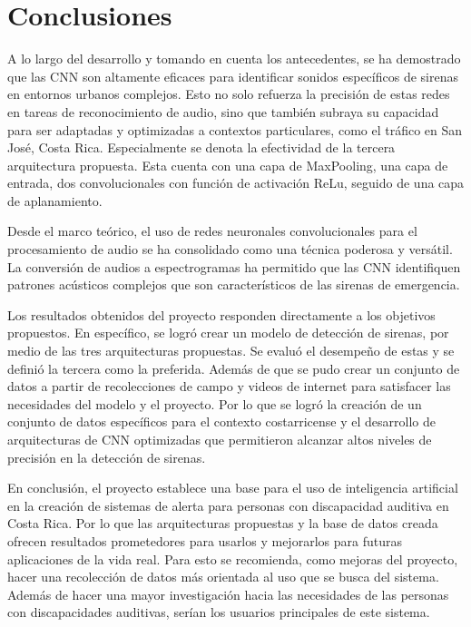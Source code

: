 \documentclass[conference, spanish, english]{IEEEtran}
\begin{document}
\section{Conclusiones}
A lo largo del desarrollo y tomando en cuenta los antecedentes, se ha demostrado que las CNN son altamente eficaces para identificar sonidos específicos de sirenas en entornos urbanos complejos. Esto no solo refuerza la precisión de estas redes en tareas de reconocimiento de audio, sino que también subraya su capacidad para ser adaptadas y optimizadas a contextos particulares, como el tráfico en San José, Costa Rica. Especialmente se denota la efectividad de la tercera arquitectura propuesta. Esta cuenta con una capa de MaxPooling, una capa de entrada, dos convolucionales con función de activación ReLu, seguido de una capa de aplanamiento.

Desde el marco teórico, el uso de redes neuronales convolucionales para el procesamiento de audio se ha consolidado como una técnica poderosa y versátil. La conversión de audios a espectrogramas ha permitido que las CNN identifiquen patrones acústicos complejos que son característicos de las sirenas de emergencia.

Los resultados obtenidos del proyecto responden directamente a los objetivos propuestos. En específico, se logró crear un modelo de detección de sirenas, por medio de las tres arquitecturas propuestas. Se evaluó el desempeño de estas y se definió la tercera como la preferida. Además de que se pudo crear un conjunto de datos a partir de recolecciones de campo y videos de internet para satisfacer las necesidades del modelo y el proyecto. Por lo que se logró la creación de un conjunto de datos específicos para el contexto costarricense y el desarrollo de arquitecturas de CNN optimizadas que permitieron alcanzar altos niveles de precisión en la detección de sirenas.

En conclusión, el proyecto establece una base para el uso de inteligencia artificial en la creación de sistemas de alerta para personas con discapacidad auditiva en Costa Rica. Por lo que las arquitecturas propuestas y la base de datos creada ofrecen resultados prometedores para usarlos y mejorarlos para futuras aplicaciones de la vida real. Para esto se recomienda, como mejoras del proyecto, hacer una recolección de datos más orientada al uso que se busca del sistema. Además de hacer una mayor investigación hacia las necesidades de las personas con discapacidades auditivas, serían los usuarios principales de este sistema. 

\appendices{}



\end{document}
